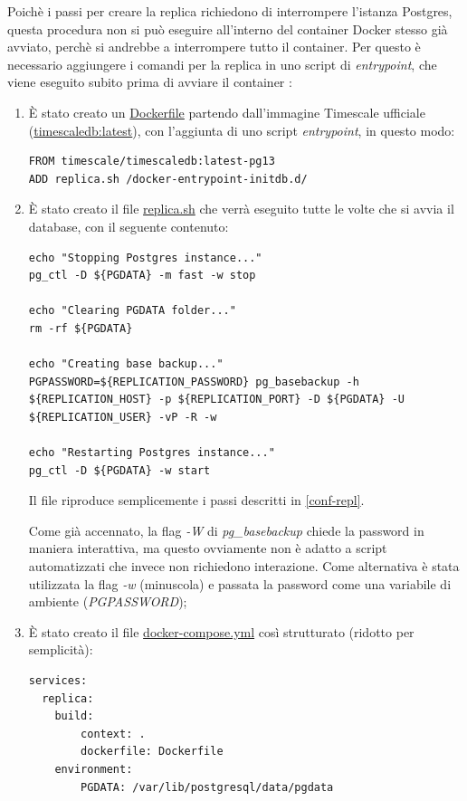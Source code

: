 Poichè i passi per creare la replica richiedono di interrompere l'istanza Postgres, questa procedura non si può eseguire all'interno del container Docker stesso già avviato, perchè si andrebbe a interrompere tutto il container.
Per questo è necessario aggiungere i comandi per la replica in uno script di \textit{entrypoint}, che viene eseguito subito prima di avviare il container \cite{dockerfile}:
\begin{enumerate}
  \item È stato creato un \url{Dockerfile} partendo dall'immagine Timescale ufficiale (\url{timescaledb:latest}), con l'aggiunta di uno script \textit{entrypoint}, in questo modo:
  \vspace{1mm}
  \begin{lstlisting}[]
FROM timescale/timescaledb:latest-pg13
ADD replica.sh /docker-entrypoint-initdb.d/
\end{lstlisting}
  \item È stato creato il file \url{replica.sh} che verrà eseguito tutte le volte che si avvia il database, con il seguente contenuto:
  \vspace{1mm}
  \begin{lstlisting}[]
echo "Stopping Postgres instance..." 
pg_ctl -D ${PGDATA} -m fast -w stop

echo "Clearing PGDATA folder..." 
rm -rf ${PGDATA}

echo "Creating base backup..." 
PGPASSWORD=${REPLICATION_PASSWORD} pg_basebackup -h ${REPLICATION_HOST} -p ${REPLICATION_PORT} -D ${PGDATA} -U ${REPLICATION_USER} -vP -R -w

echo "Restarting Postgres instance..." 
pg_ctl -D ${PGDATA} -w start
\end{lstlisting}
Il file riproduce semplicemente i passi descritti in \ref{conf-repl}.

Come già accennato, la flag \textit{-W} di \textit{pg\_basebackup} chiede la password in maniera interattiva, ma questo ovviamente non è adatto a script automatizzati che invece non richiedono interazione. Come alternativa è stata utilizzata la flag \textit{-w} (minuscola) e passata la password come una variabile di ambiente (\textit{PGPASSWORD});
\item È stato creato il file \url{docker-compose.yml} così strutturato (ridotto per semplicità):
\vspace{1mm}
  \begin{lstlisting}[]
services:
  replica:
    build:
        context: .
        dockerfile: Dockerfile
    environment:
        PGDATA: /var/lib/postgresql/data/pgdata


\end{lstlisting}
\end{enumerate}
